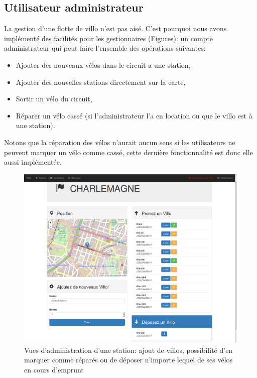 \documentclass[a4paper,10pt]{article}
\begin{document}
\subsection{Utilisateur administrateur}
La gestion d'une flotte de villo n'est pas aisé. C'est pourquoi nous avons implémenté
des facilités pour les gestionnaires (Figures): un compte administrateur qui peut faire
l'ensemble des opérations suivantes: 
\begin{itemize}
	\item Ajouter des nouveaux vélos dans le circuit a une station,
	\item Ajouter des nouvelles stations directement sur la carte,
	\item Sortir un vélo du circuit,
	\item Réparer un vélo cassé (si l'administrateur l'a en location ou que le villo est à une station).
\end{itemize}

Notons que la réparation des vélos n'aurait aucun sens si les utilisateurs ne peuvent
marquer un vélo comme cassé, cette dernière fonctionnalité est donc elle aussi implémentée.

\begin{figure}[H]
  \centering
  \includegraphics[scale=0.2]{admin-station.png}
  \caption{\label{fig:admin-station} Vues d'administration d'une station: ajout de
    villos, possibilité d'en marquer comme réparés ou de déposer n'importe lequel
    de ses vélos en cours d'emprunt}
\end{figure}
\end{document}
